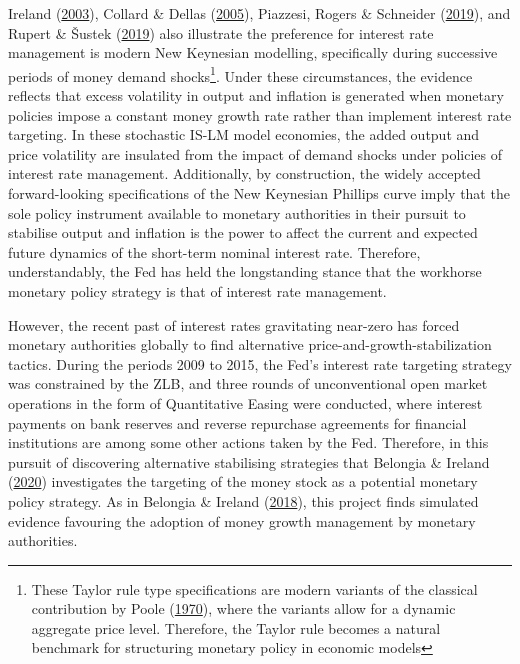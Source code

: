 \documentclass[11pt,preprint, authoryear]{elsarticle}
\numberwithin{equation}{section}
\numberwithin{figure}{section}
\numberwithin{table}{section}
\let\rmarkdownfootnote\footnote%
\def\footnote{\protect\rmarkdownfootnote}
\begin{document}
Ireland (\protect\hyperlink{ref-ireland2003}{2003}), Collard \& Dellas
(\protect\hyperlink{ref-collard2005}{2005}), Piazzesi, Rogers \&
Schneider (\protect\hyperlink{ref-piazzesi2019}{2019}), and Rupert \&
Šustek (\protect\hyperlink{ref-rupert2019}{2019}) also illustrate the
preference for interest rate management is modern New Keynesian
modelling, specifically during successive periods of money demand
shocks\footnote{These Taylor rule type specifications are modern
  variants of the classical contribution by Poole
  (\protect\hyperlink{ref-poole1970}{1970}), where the variants allow
  for a dynamic aggregate price level. Therefore, the Taylor rule
  becomes a natural benchmark for structuring monetary policy in
  economic models}. Under these circumstances, the evidence reflects
that excess volatility in output and inflation is generated when
monetary policies impose a constant money growth rate rather than
implement interest rate targeting. In these stochastic IS-LM model
economies, the added output and price volatility are insulated from the
impact of demand shocks under policies of interest rate management.
Additionally, by construction, the widely accepted forward-looking
specifications of the New Keynesian Phillips curve imply that the sole
policy instrument available to monetary authorities in their pursuit to
stabilise output and inflation is the power to affect the current and
expected future dynamics of the short-term nominal interest rate.
Therefore, understandably, the Fed has held the longstanding stance that
the workhorse monetary policy strategy is that of interest rate
management.

However, the recent past of interest rates gravitating near-zero has
forced monetary authorities globally to find alternative
price-and-growth-stabilization tactics. During the periods 2009 to 2015,
the Fed's interest rate targeting strategy was constrained by the ZLB,
and three rounds of unconventional open market operations in the form of
Quantitative Easing were conducted, where interest payments on bank
reserves and reverse repurchase agreements for financial institutions
are among some other actions taken by the Fed. Therefore, in this
pursuit of discovering alternative stabilising strategies that Belongia
\& Ireland (\protect\hyperlink{ref-belongia2020}{2020}) investigates the
targeting of the money stock as a potential monetary policy strategy. As
in Belongia \& Ireland (\protect\hyperlink{ref-belongia2018}{2018}),
this project finds simulated evidence favouring the adoption of money
growth management by monetary authorities.
\end{document}
